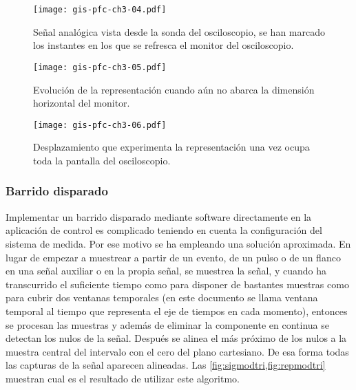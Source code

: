 \begin{figure}
	\begin{center}
		\texttt{[image: gis-pfc-ch3-04.pdf]}
	\end{center}
	\caption[Señal analógica, representación continua]{Señal analógica
	vista desde la sonda del osciloscopio, se han marcado los instantes
	en los que se refresca el monitor del osciloscopio.}
	\label{fig:sigmodcont}
\end{figure}

\begin{figure}
	\begin{center}
		\texttt{[image: gis-pfc-ch3-05.pdf]}
	\end{center}
	\caption[Evolución que sufre la representación]{Evolución de la
	representación cuando aún no abarca la dimensión horizontal del
	monitor.}
	\label{fig:firmodcont}
\end{figure}

\begin{figure}
	\begin{center}
		\texttt{[image: gis-pfc-ch3-06.pdf]}
	\end{center}
	\caption[Desplazamiento que experimenta la
	representación]{Desplazamiento que experimenta la representación
	una vez ocupa toda la pantalla del osciloscopio.}
	\label{fig:desmodcont}
\end{figure}

\subsubsection{Barrido disparado}

Implementar un barrido disparado mediante software directamente en la
aplicación de control es complicado teniendo en cuenta la configuración del
sistema de medida. Por ese motivo se ha empleando una solución aproximada.
En lugar de empezar a muestrear a partir de un evento, de un pulso o de un
flanco en una señal auxiliar o en la propia señal, se muestrea la señal, y
cuando ha transcurrido el suficiente tiempo como para disponer de bastantes
muestras como para cubrir dos ventanas temporales (en este documento se
llama ventana temporal al tiempo que representa el eje de tiempos en cada
momento), entonces se procesan las muestras y además de eliminar la
componente en continua se detectan los nulos de la señal. Después se alinea
el más próximo de los nulos a la muestra central del intervalo con el cero
del plano cartesiano. De esa forma todas las capturas de la señal aparecen
alineadas. Las \cref{fig:sigmodtri,fig:repmodtri} muestran cual es el
resultado de utilizar este algoritmo.

